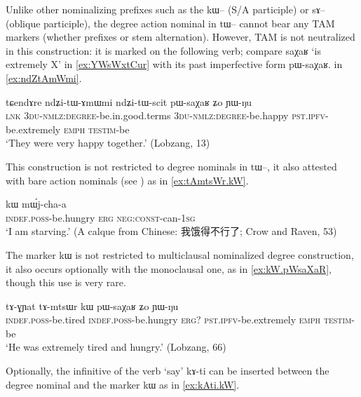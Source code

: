 \documentclass[oldfontcommands,oneside,a4paper,11pt]{article}
\newcommand{\ipa}[1]{{\phon #1}} %
\newcommand{\zh}[1]{{\cn #1}}
\begin{document}
Unlike other nominalizing prefixes such as the \ipa{kɯ--} (S/A participle) or \ipa{sɤ--} (oblique participle), the degree action nominal in \ipa{tɯ--} cannot bear any TAM markers (whether prefixes or stem alternation). However, TAM is not neutralized in this construction: it is marked on the following verb; compare \ipa{saχaʁ} `is extremely X' in \ref{ex:YWsWxtCur} with its past imperfective form \ipa{pɯ-saχaʁ}.
in \ref{ex:ndZtAmWmi}.

 \begin{exe}
\ex \label{ex:ndZtAmWmi}
\gll 
 \ipa{tɕendɤre}  	\ipa{ndʑi-tɯ-ɤmɯmi}  	\ipa{ndʑi-tɯ-scit}  	\ipa{pɯ-saχaʁ}  	\ipa{ʑo}  	\ipa{ɲɯ-ŋu}  \\
 \textsc{lnk} \textsc{3du-nmlz:degree}-be.in.good.terms \textsc{3du-nmlz:degree}-be.happy \textsc{pst.ipfv}-be.extremely \textsc{emph} \textsc{testim}-be \\
 \glt `They were very happy together.' (Lobzang, 13)
\end{exe}

This construction is not restricted to degree nominals in \ipa{tɯ--}, it also attested with bare action nominals (see \citealt[7-9]{jacques14antipassive}) as in \ref{ex:tAmtsWr.kW}.
    \begin{exe}
  \ex  \label{ex:tAmtsWr.kW}  
  \gll \ipa{tɤ-mtsɯr}  	\ipa{kɯ}  	\ipa{mɯ́j-cha-a}  \\
  \textsc{indef.poss}-be.hungry \textsc{erg} \textsc{neg:const}-can-\textsc{1sg} \\
\glt `I am starving.'  (A calque from Chinese: \zh{我饿得不行了}; Crow and Raven, 53) 
   \end{exe} 
  
 The marker \ipa{kɯ} is not restricted to multiclausal nominalized degree construction, it also occurs optionally with the monoclausal one, as in \ref{ex:kW.pWsaXaR}, though this use is very rare.
 
      \begin{exe}
  \ex  \label{ex:kW.pWsaXaR}  
  \gll 
   \ipa{tɤ-ɣɲat}  	\ipa{tɤ-mtsɯr}  	\ipa{kɯ}  	\ipa{pɯ-saχaʁ}  	\ipa{ʑo}  	\ipa{ɲɯ-ŋu}  \\
      \textsc{indef.poss}-be.tired     \textsc{indef.poss}-be.hungry \textsc{erg?} \textsc{pst.ipfv}-be.extremely \textsc{emph} \textsc{testim}-be \\
      \glt `He was extremely tired and hungry.' (Lobzang, 66)
   \end{exe} 

Optionally, the infinitive of the verb `say' \ipa{kɤ-ti} can be inserted between the degree nominal and the marker \ipa{kɯ} as in \ref{ex:kAti.kW}.
\end{document}
